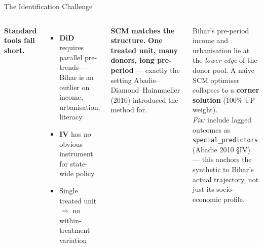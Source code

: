 \documentclass[aspectratio=169,11pt]{beamer}
\newcommand{\highlight}[1]{\textcolor{AmberDark}{\textbf{#1}}}
\newcommand{\navy}[1]{\textcolor{NavyPrimary}{\textbf{#1}}}
\newcommand{\redtext}[1]{\textcolor{DangerRed}{\textbf{#1}}}
\newcommand{\toptight}{\vspace{-0.15cm}}
\begin{document}
\begin{frame}{The Identification Challenge}
  \toptight
  \begin{columns}[T,onlytextwidth]
      \textbf{\navy{\small Standard tools fall short.}}
      \begin{itemize}
        \item \redtext{DiD} requires parallel pre-trends --- Bihar is an
              outlier on income, urbanisation, literacy
        \item \redtext{IV} has no obvious instrument for state-wide policy
        \item Single treated unit $\Rightarrow$ no within-treatment variation
      \end{itemize}
      \vspace{0.30cm}
      \begin{tcolorbox}[amberbox]
        \scriptsize\textbf{SCM matches the structure.}
        \highlight{One treated unit, many donors, long pre-period} ---
        exactly the setting Abadie--Diamond--Hainmueller (2010) introduced
        the method for.
      \end{tcolorbox}

      \begin{tcolorbox}[navybox,title={\faExclamationTriangle\enspace Convex hull caveat}]
        \scriptsize Bihar's pre-period income and urbanisation lie at the
        \emph{lower edge} of the donor pool. A naive SCM optimiser collapses
        to a \redtext{corner solution} (100\% UP weight).
        \vspace{0.15cm}\\
        \emph{Fix:} include lagged outcomes as
        \texttt{special\_predictors} (Abadie 2010 §IV) --- this anchors the
        synthetic to Bihar's actual trajectory, not just its socio-economic
        profile.
      \end{tcolorbox}
  \end{columns}
\end{frame}
\end{document}
